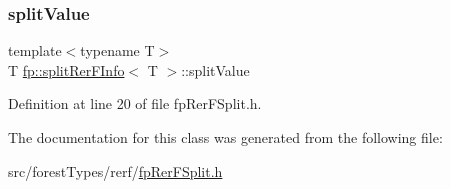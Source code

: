 \mbox{\label{classfp_1_1splitRerFInfo_a9bdbbaacd0da790fa938a0f5176890bc}} 
\subsubsection{\texorpdfstring{split\+Value}{splitValue}}
{\footnotesize\ttfamily template$<$typename T$>$ \\
T \hyperlink{classfp_1_1splitRerFInfo}{fp\+::split\+Rer\+F\+Info}$<$ T $>$\+::split\+Value\hspace{0.3cm}{\ttfamily [protected]}}



Definition at line 20 of file fp\+Rer\+F\+Split.\+h.



The documentation for this class was generated from the following file\+:\begin{DoxyCompactItemize}
\item 
src/forest\+Types/rerf/\hyperlink{fpRerFSplit_8h}{fp\+Rer\+F\+Split.\+h}\end{DoxyCompactItemize}
